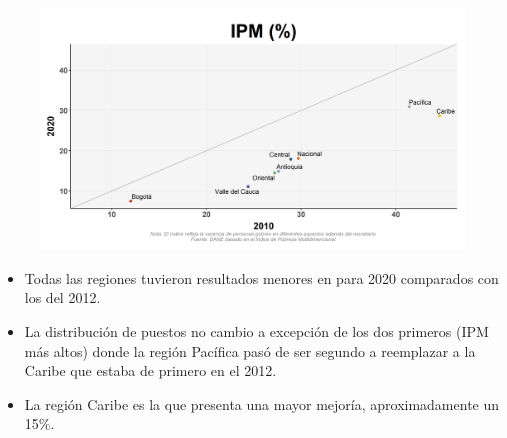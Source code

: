     \begin{figure}[H]
        \caption[Índice de Pobreza Multidimensional por regiones - 2010 VS 2020 ]{\label{ipm_regiones_vs} }
        \begin{center}
        \includegraphics[width=\textwidth,keepaspectratio]{img/var_270_scatter_time.png}
        \end{center}
    \end{figure}
            \begin{itemize}
                    \item Todas las regiones tuvieron resultados menores en para 2020 comparados con los del 2012.
                    \item La distribución de puestos no cambio a excepción de los dos primeros (IPM más altos) donde la región Pacífica pasó de ser segundo a reemplazar a la Caribe que estaba de primero en el 2012.
                    \item La región Caribe es la que presenta una mayor mejoría, aproximadamente un 15\%.
                    \end{itemize}


